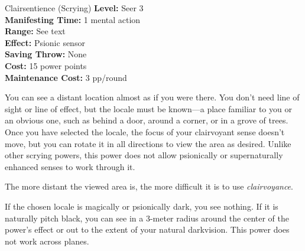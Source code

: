 {Clairsentience (Scrying)}
{
	\textbf{Level:}
	Seer 3\\
	\textbf{Manifesting Time:}
	1 mental action\\
	\textbf{Range:}
	See text\\
	\textbf{Effect:}
	Psionic sensor\\
	\textbf{Saving Throw:}
	None\\
	\textbf{Cost:}
	15 power points\\
	\textbf{Maintenance Cost:}
	3 pp/round\\
}
{
	You can see a distant location almost as if you were there. You don't need line of sight or line of effect, but the locale must be known---a place familiar to you or an obvious one, such as behind a door, around a corner, or in a grove of trees. Once you have selected the locale, the focus of your clairvoyant sense doesn't move, but you can rotate it in all directions to view the area as desired. Unlike other scrying powers, this power does not allow psionically or supernaturally enhanced senses to work through it.

	The more distant the viewed area is, the more difficult it is to use \emph{clairvoyance}.


	If the chosen locale is magically or psionically dark, you see nothing. If it is naturally pitch black, you can see in a 3-meter radius around the center of the power's effect or out to the extent of your natural darkvision. This power does not work across planes. 
}
